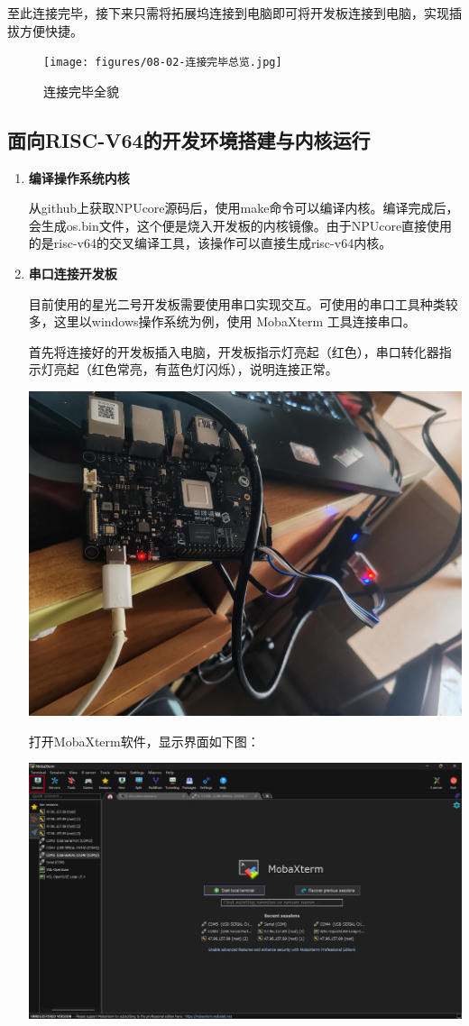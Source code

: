 至此连接完毕，接下来只需将拓展坞连接到电脑即可将开发板连接到电脑，实现插拔方便快捷。

\begin{figure}[htb]
	\centering
	\texttt{[image: figures/08-02-连接完毕总览.jpg]}
	\caption{
		连接完毕全貌
	}
	\label{fig:pipe}
\end{figure}


\subsection{面向RISC-V64的开发环境搭建与内核运行}

\begin{enumerate}
	\item \textbf{编译操作系统内核}
	
	从github上获取NPUcore源码后，使用make命令可以编译内核。编译完成后，会生成os.bin文件，这个便是烧入开发板的内核镜像。由于NPUcore直接使用的是risc-v64的交叉编译工具，该操作可以直接生成risc-v64内核。
	
	\item \textbf{串口连接开发板}
	
	目前使用的星光二号开发板需要使用串口实现交互。可使用的串口工具种类较多，这里以windows操作系统为例，使用
	MobaXterm 工具连接串口。
	
	首先将连接好的开发板插入电脑，开发板指示灯亮起（红色），串口转化器指示灯亮起（红色常亮，有蓝色灯闪烁），说明连接正常。
	~~
	
	\centering
	\includegraphics[width=0.58\linewidth]{figures/08-02-星光二号线路.jpg}
	\raggedright
	
	
	打开MobaXterm软件，显示界面如下图：
	
	\centering
	\includegraphics[width=0.58\linewidth]{figures/08-02-MobaXterm界面.jpg}
	\raggedright
	

\end{enumerate}
